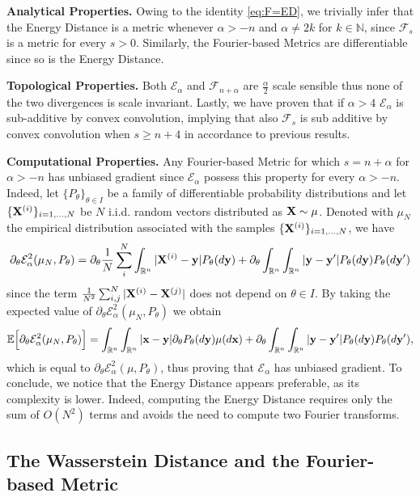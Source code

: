 \documentclass{article}
\renewcommand{\ge}{\geqslant}
\def\bx{{\bf x}}
\def\bX{{\bf X}}
\def\by{{\bf y}}
\def \erre{\mathbb{R}}
\def \enne{\mathbb{N}}
\begin{document}
\textbf{Analytical Properties.} Owing to the identity \eqref{eq:F=ED}, we trivially infer that the Energy Distance is a metric whenever $\alpha>-n$ and $\alpha \neq 2k$ for $k\in\enne$, since $\mathcal{F}_s$ is a metric for every $s>0$.
% 
Similarly, the Fourier-based Metrics are differentiable since so is the Energy Distance.
% 

% 
\textbf{Topological Properties.} Both $\mathcal{E}_\alpha$ and $\mathcal{F}_{n+\alpha}$ are $\frac{\alpha}{2}$ scale sensible thus none of the two divergences is scale invariant.
% 
Lastly, we have proven that if $\alpha>4$ $\mathcal{E}_\alpha$ is sub-additive by convex convolution, implying that also $\mathcal{F}_s$ is sub additive by convex convolution when $s\ge n+4$ in accordance to previous results.
% 

% 
{\textbf{Computational Properties.}} Any Fourier-based Metric for which $s=n+\alpha$ for $\alpha>-n$ has unbiased gradient since $\mathcal{E}_{\alpha}$ possess this property for every $\alpha>-n$.
% 
Indeed, let $\{P_\theta\}_{\theta\in I}$ be a family of differentiable probability distributions and let $\{\bX^{(i)}\}_{i=1,\dots,N}$ be $N$ i.i.d. random vectors distributed as $\bX\sim\mu$.
% 
Denoted with $\mu_N$ the empirical distribution associated with the samples $\{\bX^{(i)}\}_{i=1,\dots,N}$, we have
\[
\partial_\theta \mathcal{E}^2_\alpha(\mu_N,P_\theta)=\partial_\theta\frac{1}{N}\sum_i^N\int_{\erre^n}|\bX^{(i)}-\by|P_\theta(d\by)+\partial_\theta\int_{\erre^n}\int_{\erre^n}|\by-\by'|P_\theta(d\by)P_\theta(d\by')
\]
since the term $\frac{1}{N^2}\sum_{i,j}^N|\bX^{(i)}-\bX^{(j)}|$ does not depend on $\theta\in I$.
% 
By taking the expected value of $\partial_\theta \mathcal{E}^2_\alpha(\mu_N,P_\theta)$ we obtain
\[
\mathbb{E}\Big[\partial_\theta \mathcal{E}^2_\alpha(\mu_N,P_\theta)\Big]=\int_{\erre^n}\int_{\erre^n}|\bx-\by|\partial_\theta P_\theta(d\by)\mu(d\bx)+\partial_\theta\int_{\erre^n}\int_{\erre^n}|\by-\by'|P_\theta(d\by)P_\theta(d\by'),
\]
which is equal to $\partial_\theta \mathcal{E}_\alpha^2(\mu,P_\theta)$, thus proving that $\mathcal{E}_\alpha$ has unbiased gradient.
% 
To conclude, we notice that the Energy Distance appears preferable, as its complexity is lower.
% 
Indeed, computing the Energy Distance requires only the sum of $O(N^2)$ terms and avoids the need to compute two Fourier transforms.








\subsection{The Wasserstein Distance and the Fourier-based Metric}
\end{document}
